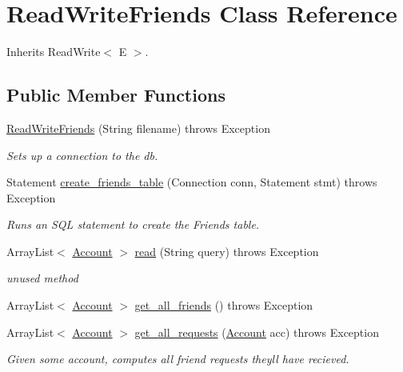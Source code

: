 \hypertarget{class_read_write_friends}{}\section{Read\+Write\+Friends Class Reference}
\label{class_read_write_friends}


Inherits Read\+Write$<$ E $>$.

\subsection*{Public Member Functions}
\begin{DoxyCompactItemize}
\item 
\hyperlink{class_read_write_friends_afccd5d07c3f694a74617a749ee4d5d09}{Read\+Write\+Friends} (String filename)  throws Exception     
\begin{DoxyCompactList}\small\item\em Sets up a connection to the db. \end{DoxyCompactList}\item 
Statement \hyperlink{class_read_write_friends_abd8ff6b1154e07ae729ce151d7160fa9}{create\+\_\+friends\+\_\+table} (Connection conn, Statement stmt)  throws Exception     
\begin{DoxyCompactList}\small\item\em Runs an S\+QL statement to create the Friends table. \end{DoxyCompactList}\item 
\mbox{\label{class_read_write_friends_a1a30e3f1adc90e7e69c3c4855dc00738}} 
Array\+List$<$ \hyperlink{class_account}{Account} $>$ \hyperlink{class_read_write_friends_a1a30e3f1adc90e7e69c3c4855dc00738}{read} (String query)  throws Exception     
\begin{DoxyCompactList}\small\item\em unused method \end{DoxyCompactList}\item 
Array\+List$<$ \hyperlink{class_account}{Account} $>$ \hyperlink{class_read_write_friends_a1ca7ef459d275d7de8274ce119e4895d}{get\+\_\+all\+\_\+friends} ()  throws Exception     
\item 
Array\+List$<$ \hyperlink{class_account}{Account} $>$ \hyperlink{class_read_write_friends_ab55c8c1b2fc693bad5da1da3774dfab2}{get\+\_\+all\+\_\+requests} (\hyperlink{class_account}{Account} acc)  throws Exception     
\begin{DoxyCompactList}\small\item\em Given some account, computes all friend requests they\textquotesingle{}ll have recieved. \end{DoxyCompactList}\item 

\end{DoxyCompactItemize}

